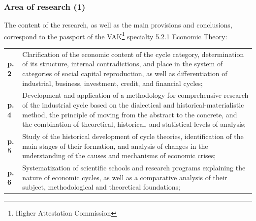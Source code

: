 \begin{frame}
  \frametitle{Area of research (1)}
  The content of the research, as well as the main provisions and conclusions, correspond to the passport of the VAK\footnote{Higher Attestation Commission} specialty 5.2.1 \textquotedbl{}Economic Theory\textquotedbl{}:

  \vspace{10pt}

  \begin{tabularx}{\textwidth}{l>{\raggedright\arraybackslash\hyphenpenalty=10000\exhyphenpenalty=10000}X}
    \textbf{p. 2} & Clarification of the economic content of the cycle category, determination of its structure, internal contradictions, and place in the system of categories of social capital reproduction, as well as differentiation of industrial, business, investment, credit, and financial cycles; \\
    \textbf{p. 4} & Development and application of a methodology for comprehensive research of the industrial cycle based on the dialectical and historical-materialistic method, the principle of moving from the abstract to the concrete, and the combination of theoretical, historical, and statistical levels of analysis; \\
    \textbf{p. 5} & Study of the historical development of cycle theories, identification of the main stages of their formation, and analysis of changes in the understanding of the causes and mechanisms of economic crises; \\
    \textbf{p. 6} & Systematization of scientific schools and research programs explaining the nature of economic cycles, as well as a comparative analysis of their subject, methodological and theoretical foundations;
  \end{tabularx}
\end{frame}

